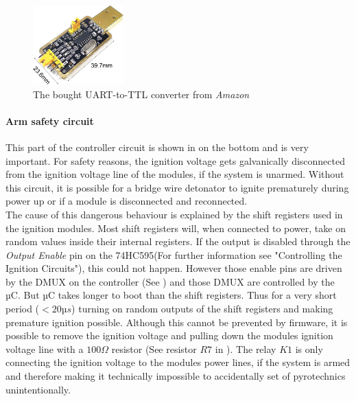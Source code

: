 \begin{figure}[!ht]
    \centering
    \includegraphics[width=3.5cm]{./Figures/uart_ttl.jpg}
    \caption{The bought UART-to-TTL converter from \textit{Amazon}}
    \label{fig:uart_ttl}     
\end{figure}


\pagebreak

\paragraph{Arm safety circuit}
This part of the controller circuit is shown in  on the bottom and is very important. For safety reasons, the ignition voltage gets galvanically disconnected from the ignition voltage line of the modules, if the system is unarmed. Without this circuit, it is possible for a bridge wire detonator to ignite prematurely during power up or if a module is disconnected and reconnected. \\

\noindent The cause of this dangerous behaviour is explained by the shift registers used in the ignition modules. Most shift registers will, when connected to power, take on random values inside their internal registers. If the output is disabled through the \textit{Output Enable} pin on the 74HC595(For further information see  "Controlling the Ignition Circuits"), this could not happen. However those enable pins are driven by the DMUX on the controller (See ) and those DMUX are controlled by the µC. But µC takes longer to boot than the shift registers. Thus for a very short period ($<20µs$) turning on random outputs of the shift registers and making premature ignition possible. Although this cannot be prevented by firmware, it is possible to remove the ignition voltage and pulling down the modules ignition voltage line with a $100\Omega$ resistor (See resistor $R7$ in ). The relay $K1$ is only connecting the ignition voltage to the modules power lines, if the system is armed and therefore making it technically impossible to accidentally set of pyrotechnics unintentionally.

